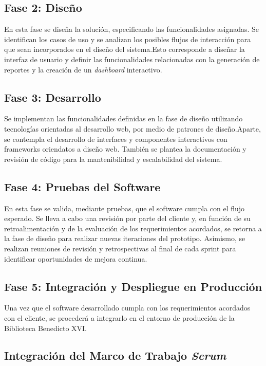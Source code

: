 \documentclass[spanish]{ieee_upb}
\begin{document}
\subsection{Fase 2: Diseño}
En esta fase se diseña la solución, especificando las funcionalidades asignadas. Se identifican los casos de uso y se analizan los posibles flujos de interacción para que sean incorporados en el diseño del sistema.Esto corresponde a diseñar la interfaz de usuario y definir las funcionalidades relacionadas con la generación de reportes y la creación de un \textit{dashboard} interactivo.


\subsection{Fase 3: Desarrollo}

Se implementan las funcionalidades definidas en la fase de diseño utilizando tecnologías orientadas al desarrollo web, por medio de patrones de diseño.Aparte, se contempla el desarrollo de interfaces y componentes interactivos con frameworks oriendatos a diseño web. También se plantea la documentación y revisión de código para la mantenibilidad y escalabilidad del sistema. 

\subsection{Fase 4: Pruebas del Software}

En esta fase se valida, mediante pruebas, que el software cumpla con el flujo esperado. Se lleva a cabo una revisión por parte del cliente y, en función de su retroalimentación y de la evaluación de los requerimientos acordados, se retorna a la fase de diseño para realizar nuevas iteraciones del prototipo. Asimismo, se realizan reuniones de revisión y retrospectivas al final de cada sprint para identificar oportunidades de mejora continua.


\subsection{Fase 5: Integración y Despliegue en Producción}

Una vez que el software desarrollado cumpla con los requerimientos acordados con el cliente, se procederá a integrarlo en el entorno de producción de la Biblioteca Benedicto XVI.


\subsection{Integración del Marco de Trabajo \textit{Scrum}}
\end{document}
